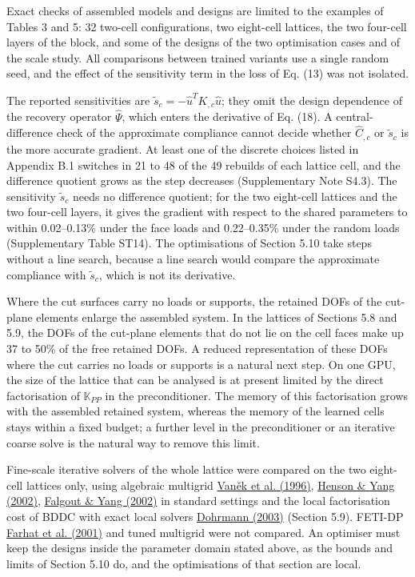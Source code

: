 \documentclass[preprint,12pt,authoryear]{elsarticle}
\begin{document}
Exact checks of assembled models and designs are limited to the examples of Tables 3 and 5: 32 two-cell configurations, two eight-cell lattices, the two four-cell layers of the block, and some of the designs of the two optimisation cases and of the scale study. All comparisons between trained variants use a single random seed, and the effect of the sensitivity term in the loss of Eq. (13) was not isolated.

The reported sensitivities are \(\widetilde s_c=-\widehat u^TK_{,c}\widehat u\); they omit the design dependence of the recovery operator \(\widehat\Psi\), which enters the derivative of Eq. (18). A central-difference check of the approximate compliance cannot decide whether \(\widehat C_{,c}\) or \(\widetilde s_c\) is the more accurate gradient. At least one of the discrete choices listed in Appendix B.1 switches in 21 to 48 of the 49 rebuilds of each lattice cell, and the difference quotient grows as the step decreases (Supplementary Note S4.3). The sensitivity \(\widetilde s_c\) needs no difference quotient; for the two eight-cell lattices and the two four-cell layers, it gives the gradient with respect to the shared parameters to within 0.02--0.13\% under the face loads and 0.22--0.35\% under the random loads (Supplementary Table ST14). The optimisations of Section 5.10 take steps without a line search, because a line search would compare the approximate compliance with \(\widetilde s_c\), which is not its derivative.

Where the cut surfaces carry no loads or supports, the retained DOFs of the cut-plane elements enlarge the assembled system. In the lattices of Sections 5.8 and 5.9, the DOFs of the cut-plane elements that do not lie on the cell faces make up 37 to 50\% of the free retained DOFs. A reduced representation of these DOFs where the cut carries no loads or supports is a natural next step. On one GPU, the size of the lattice that can be analysed is at present limited by the direct factorisation of \(\mathbb K_{PP}\) in the preconditioner. The memory of this factorisation grows with the assembled retained system, whereas the memory of the learned cells stays within a fixed budget; a further level in the preconditioner or an iterative coarse solve is the natural way to remove this limit.

Fine-scale iterative solvers of the whole lattice were compared on the two eight-cell lattices only, using algebraic multigrid \href{https://doi.org/10.1007/BF02238511}{Vaněk et al. (1996)}, \href{https://doi.org/10.1016/S0168-9274(01)00115-5}{Henson \& Yang (2002)}, \href{https://doi.org/10.1007/3-540-47789-6_66}{Falgout \& Yang (2002)} in standard settings and the local factorisation cost of BDDC with exact local solvers \href{https://doi.org/10.1137/S1064827502412887}{Dohrmann (2003)} (Section 5.9). FETI-DP \href{https://doi.org/10.1002/nme.76}{Farhat et al. (2001)} and tuned multigrid were not compared. An optimiser must keep the designs inside the parameter domain stated above, as the bounds and limits of Section 5.10 do, and the optimisations of that section are local.
\end{document}
